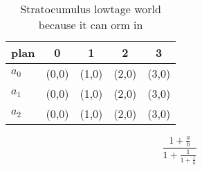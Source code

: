 \documentclass[a4paper]{article}
\begin{document}
\begin{table}
\begin{adjustbox}{width=0.6\columnwidth}
\begin{tabular}{|l|l|l|l|l|}
\hline
\textbf{plan} & \multicolumn{1}{c|}{\textbf{0}} & \multicolumn{1}{c|}{\textbf{1}} & \multicolumn{1}{c|}{\textbf{2}} & \multicolumn{1}{c|}{\textbf{3}} \\ \hline
\textbf{$a_0$}  & (0,0) & (1,0) & (2,0) & (3,0) \\ \hline
\textbf{$a_1$}  & (0,0) & (1,0) & (2,0) & (3,0) \\ \hline
\textbf{$a_2$}  & (0,0) & (1,0) & (2,0) & (3,0) \\ \hline
\end{tabular}
\end{adjustbox}
\caption{Stratocumulus lowtage world because it can orm in
}
\end{table}

\[ \frac{1+\frac{a}{b}}{1+\frac{1}{1+\frac{1}{a}}} \]
\end{document}
